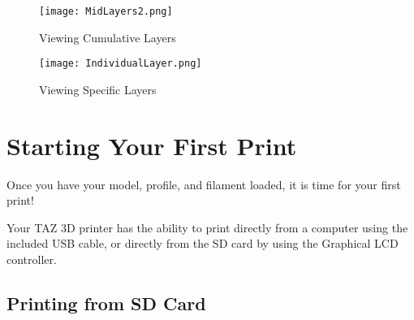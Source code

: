 \begin{figure}[H]
\centering
\texttt{[image: MidLayers2.png]}
\caption{Viewing Cumulative Layers}
\label{fig:Mid Layers View}
\end{figure}

\begin{figure}[H]
\centering
\texttt{[image: IndividualLayer.png]}
\caption{Viewing Specific Layers}
\label{fig:Viewing Specific Layer}
\end{figure}

\section{Starting Your First Print}
Once you have your model, profile, and filament loaded, it is time for your first print! 






Your TAZ 3D printer has the ability to print directly from a computer using the included USB cable, or directly from the SD card by using the Graphical LCD controller.

\subsection{Printing from SD Card}

